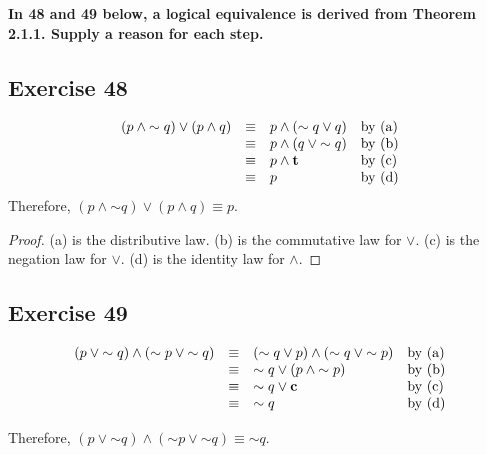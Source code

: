 \documentclass[14pt]{extarticle}
\newcommand{\true}{{\bf t}}
\newcommand{\false}{{\bf c}}
\begin{document}
{\bf In 48 and 49 below, a logical equivalence is derived from Theorem 2.1.1. Supply a reason for each step.}

\subsection{Exercise 48}
$$
    \begin{array}{rcll}
        (p \wedge {\sim q}) \vee (p \wedge q) & \equiv & p \wedge ({\sim q} \vee q) & \text{by (a)} \\
                                              & \equiv & p \wedge (q \vee {\sim q}) & \text{by (b)} \\
                                              & \equiv & p \wedge \true             & \text{by (c)} \\
                                              & \equiv & p                          & \text{by (d)} \\
    \end{array}
$$
Therefore, $(p \wedge {\sim q}) \vee (p \wedge q) \equiv p$.

\begin{proof}
    (a) is the distributive law. (b) is the commutative law for
    $\vee$. (c) is the negation law for $\vee$. (d) is the identity law for $\wedge$.
\end{proof}

\subsection{Exercise 49}
$$
    \begin{array}{rcll}
        (p \vee {\sim q}) \wedge ({\sim p} \vee {\sim q}) & \equiv & ({\sim q} \vee p) \wedge ({\sim q} \vee {\sim p}) & \text{by (a)} \\
                                                          & \equiv & {\sim q} \vee (p \wedge {\sim p})                 & \text{by (b)} \\
                                                          & \equiv & {\sim q} \vee \false                              & \text{by (c)} \\
                                                          & \equiv & {\sim q}                                          & \text{by (d)} \\
    \end{array}
$$

Therefore, $(p \vee {\sim q}) \wedge ({\sim p} \vee {\sim q}) \equiv {\sim q}$.
\end{document}
